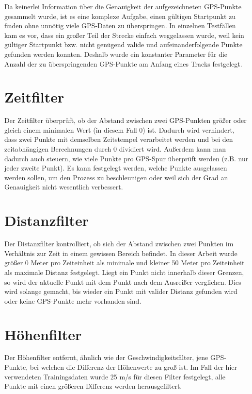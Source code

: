 
Da keinerlei Information über die Genauigkeit der aufgezeichneten GPS-Punkte gesammelt wurde, ist es eine komplexe Aufgabe, einen gültigen Startpunkt zu finden ohne unnötig viele GPS-Daten zu überspringen. In einzelnen Testfällen kam es vor, dass ein großer Teil der Strecke einfach weggelassen wurde, weil kein gültiger Startpunkt bzw. nicht genügend valide und aufeinanderfolgende Punkte gefunden werden konnten. Deshalb wurde ein konstanter Parameter für die Anzahl der zu überspringenden GPS-Punkte am Anfang eines Tracks festgelegt.

\section*{Zeitfilter}
Der Zeitfilter überprüft, ob der Abstand zwischen zwei GPS-Punkten größer oder gleich einem minimalen Wert (in diesem Fall 0) ist. Dadurch wird verhindert, dass zwei Punkte mit demselben Zeitstempel verarbeitet werden und bei den zeitabhängigen Berechnungen durch 0 dividiert wird. Außerdem kann man dadurch auch steuern, wie viele Punkte pro GPS-Spur überprüft werden  (z.B. nur jeder zweite Punkt). Es kann festgelegt werden, welche Punkte ausgelassen werden sollen, um den Prozess zu beschleunigen oder weil sich der Grad an Genauigkeit nicht wesentlich verbessert.

\section*{Distanzfilter}
Der Distanzfilter kontrolliert, ob sich der Abstand zwischen zwei Punkten im Verhältnis zur Zeit in einem gewissen Bereich befindet. In dieser Arbeit wurde größer 0 Meter pro Zeiteinheit als minimale und kleiner 50 Meter pro Zeiteinheit als maximale Distanz festgelegt. Liegt ein Punkt nicht innerhalb dieser Grenzen, so wird der aktuelle Punkt mit dem Punkt nach dem Ausreißer verglichen. Dies wird solange gemacht, bis wieder ein Punkt mit valider Distanz gefunden wird oder keine GPS-Punkte mehr vorhanden sind.

\section*{Höhenfilter}
Der Höhenfilter entfernt, ähnlich wie der Geschwindigkeitsfilter, jene GPS-Punkte, bei welchen die Differenz der Höhenwerte zu groß ist. Im Fall der hier verwendeten Trainingsdaten wurde 25 m/s  für diesen Filter festgelegt,  alle Punkte mit einen größeren Differenz werden herausgefiltert.

